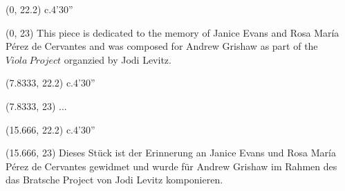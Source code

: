 \documentclass[10pt]{article}
\begin{document}
\begin{textblock}{7.333}(0, 22.2)
c.4'30''
\end{textblock}

\begin{textblock}{7.333}(0, 23)
This piece is dedicated to the memory of Janice Evans and Rosa Mar\'ia P\'erez de Cervantes and was composed for Andrew Grishaw as part of the $Viola \ Project$ organzied by Jodi Levitz.
\end{textblock}


\begin{textblock}{7.333}(7.8333, 22.2)
c.4'30''
\end{textblock}

\begin{textblock}{7.333}(7.8333, 23)
...
\end{textblock}


\begin{textblock}{7.333}(15.666, 22.2)
c.4'30''
\end{textblock}

\begin{textblock}{7.333}(15.666, 23)
Dieses St\"uck ist der Erinnerung an Janice Evans und Rosa Mar\'ia P\'erez de Cervantes gewidmet und wurde f\"ur Andrew Grishaw im Rahmen des das Bratsche Project von Jodi Levitz komponieren.
\end{textblock}
\end{document}
